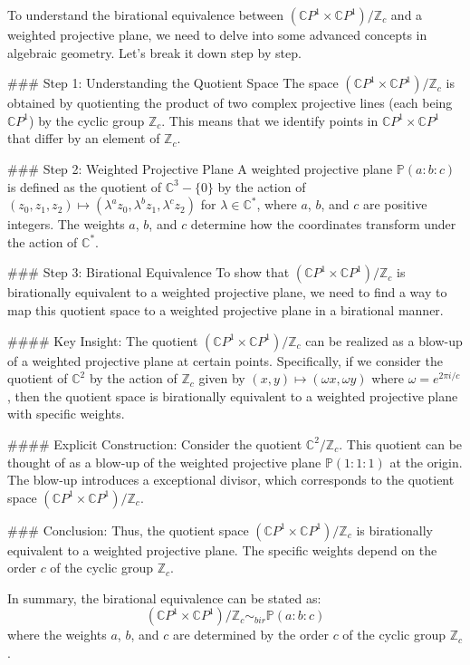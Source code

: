 To understand the birational equivalence between \(\left( \mathbb{C} P^1 \times \mathbb{C} P^1 \right) / \mathbb{Z}_c\) and a weighted projective plane, we need to delve into some advanced concepts in algebraic geometry. Let's break it down step by step.

### Step 1: Understanding the Quotient Space
The space \(\left( \mathbb{C} P^1 \times \mathbb{C} P^1 \right) / \mathbb{Z}_c\) is obtained by quotienting the product of two complex projective lines (each being \(\mathbb{C} P^1\)) by the cyclic group \(\mathbb{Z}_c\). This means that we identify points in \(\mathbb{C} P^1 \times \mathbb{C} P^1\) that differ by an element of \(\mathbb{Z}_c\).

### Step 2: Weighted Projective Plane
A weighted projective plane \(\mathbb{P}(a:b:c)\) is defined as the quotient of \(\mathbb{C}^3 - \{0\}\) by the action of \((z_0, z_1, z_2) \mapsto (\lambda^{a} z_0, \lambda^{b} z_1, \lambda^{c} z_2)\) for \(\lambda \in \mathbb{C}^*\), where \(a\), \(b\), and \(c\) are positive integers. The weights \(a\), \(b\), and \(c\) determine how the coordinates transform under the action of \(\mathbb{C}^*\).

### Step 3: Birational Equivalence
To show that \(\left( \mathbb{C} P^1 \times \mathbb{C} P^1 \right) / \mathbb{Z}_c\) is birationally equivalent to a weighted projective plane, we need to find a way to map this quotient space to a weighted projective plane in a birational manner.

#### Key Insight:
The quotient \(\left( \mathbb{C} P^1 \times \mathbb{C} P^1 \right) / \mathbb{Z}_c\) can be realized as a blow-up of a weighted projective plane at certain points. Specifically, if we consider the quotient of \(\mathbb{C}^2\) by the action of \(\mathbb{Z}_c\) given by \((x, y) \mapsto (\omega x, \omega y)\) where \(\omega = e^{2\pi i / c}\), then the quotient space is birationally equivalent to a weighted projective plane with specific weights.

#### Explicit Construction:
Consider the quotient \(\mathbb{C}^2 / \mathbb{Z}_c\). This quotient can be thought of as a blow-up of the weighted projective plane \(\mathbb{P}(1:1:1)\) at the origin. The blow-up introduces a exceptional divisor, which corresponds to the quotient space \(\left( \mathbb{C} P^1 \times \mathbb{C} P^1 \right) / \mathbb{Z}_c\).

### Conclusion:
Thus, the quotient space \(\left( \mathbb{C} P^1 \times \mathbb{C} P^1 \right) / \mathbb{Z}_c\) is birationally equivalent to a weighted projective plane. The specific weights depend on the order \(c\) of the cyclic group \(\mathbb{Z}_c\).

In summary, the birational equivalence can be stated as:
\[
\left( \mathbb{C} P^1 \times \mathbb{C} P^1 \right) / \mathbb{Z}_c \sim_{bir} \mathbb{P}(a:b:c)
\]
where the weights \(a\), \(b\), and \(c\) are determined by the order \(c\) of the cyclic group \(\mathbb{Z}_c\).

